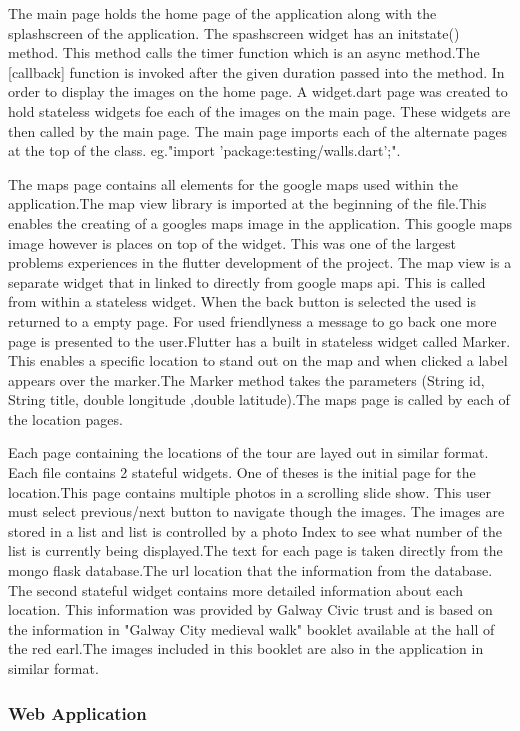 The main page holds the home page of the application along with the splashscreen of the application. The spashscreen widget has an initstate() method. This method calls the timer function which is an async method.The [callback] function is invoked after the given duration passed into the method. In order to display the images on the home page. A widget.dart page was created to hold stateless widgets foe each of the images on the main page. These widgets are then called by the main page. The main page imports each of the alternate pages at the top of the class. eg."import 'package:testing/walls.dart';".

The maps page contains all elements for the google maps used within the application.The map view library is imported at the beginning of the file.This enables the creating of a googles maps image in the application. This google maps image however is places on top of the widget. This was one of the largest problems experiences in the flutter development of the project. The map view is a separate widget that in linked to directly from google maps api. This is called from within a stateless widget. When the back button is selected the used is returned to a empty page. For used friendlyness a message to go back one more page is presented to the user.Flutter has a built in stateless widget called Marker. This enables a specific location to stand out on the map and when clicked a label appears over the marker.The Marker method takes the parameters (String id, String title, double longitude ,double latitude).The maps page is called by each of the location pages.

Each page containing the locations of the tour are layed out in similar format. Each file contains 2 stateful widgets. One of theses is the initial page for the location.This page contains multiple photos in a scrolling slide show. This user must select previous/next button to navigate though the images. The images are stored in a list and list is controlled by a photo Index to see what number of the list is currently being displayed.The text for each page is taken directly from the mongo flask database.The url location that the information from the database. The second stateful widget contains more detailed information about each location. This information was provided by Galway Civic trust and is based on the information in "Galway City medieval walk" booklet available at the hall of the red earl.The images included in this booklet are also in the application in similar format.

\subsubsection{Web Application}

